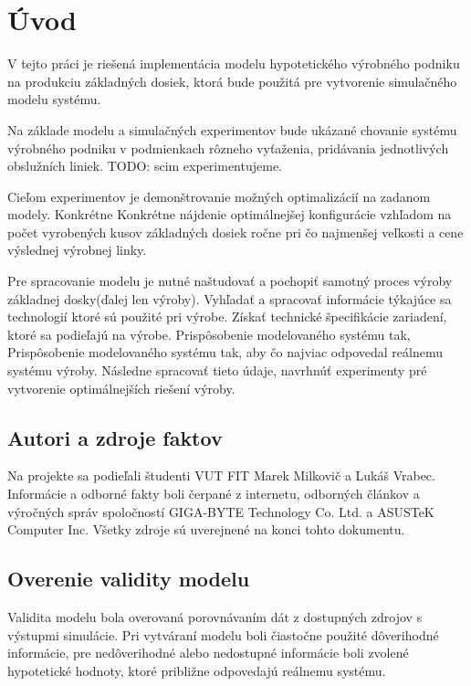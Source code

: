 \documentclass[12pt,a4paper,titlepage,final]{article}
\begin{document}
\newpage
\pagestyle{plain}
\setcounter{page}{1}

\section{Úvod}
V tejto práci je riešená implementácia modelu hypotetického výrobného podniku
na produkciu základných dosiek, ktorá bude použitá pre vytvorenie simulačného
modelu systému.

Na základe modelu a simulačných experimentov bude ukázané chovanie systému
výrobného podniku v podmienkach rôzneho vyťaženia, pridávania jednotlivých
obslužních liniek.
TODO: scim experimentujeme. 

Cieľom experimentov je demonštrovanie možných optimalizácií na zadanom modely. Kon\-kré\-tne
Konkrétne nájdenie optimálnejšej konfigurácie vzhľadom na počet vyrobených
kusov základných dosiek ročne pri čo najmenšej veľkosti a cene výslednej 
výrobnej linky.

Pre spracovanie modelu je nutné naštudovať a pochopiť samotný proces výroby
základnej dosky(ďalej len výroby). Vyhľadať a spracovať informácie týkajúce sa 
technologií ktoré sú použité pri výrobe. Získať technické špecifikácie zariadení,
ktoré sa podieľajú na výrobe. Pri\-spô\-so\-be\-nie modelovaného systému tak,
Prispôsobenie modelovaného systému tak, aby čo najviac odpovedal reálnemu
systému výroby. Následne spracovať tieto údaje, navrhnúť experimenty pré 
vytvorenie optimálnejších riešení výroby. 

\subsection{Autori a zdroje faktov}
Na projekte sa podieľali študenti VUT FIT Marek Milkovič a Lukáš Vrabec. Informácie
a odborné fakty boli čerpané z internetu, odborných článkov a výročných
správ spoločností GIGA-BYTE Technology Co. Ltd. a ASUSTeK Computer Inc.
Všetky zdroje sú uverejnené na konci tohto dokumentu.

\subsection{Overenie validity modelu}
Validita modelu bola overovaná porovnávaním dát z dostupných zdrojov s výstupmi
simulácie. Pri vytváraní modelu boli čiastočne použité dôverihodné informácie,
pre nedôverihodné alebo nedostupné informácie boli zvolené hypotetické hodnoty,
ktoré približne odpovedajú reálnemu systému. 
\end{document}
